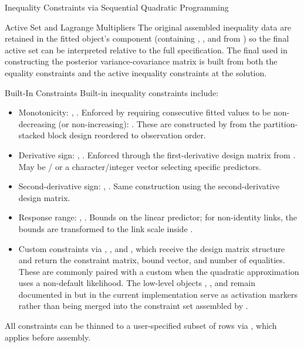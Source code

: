 \begin{Section}{Inequality Constraints via Sequential Quadratic Programming}
\begin{SubSection}{Active Set and Lagrange Multipliers}
The original assembled inequality data are retained in the fitted
object's  component (containing ,
, and  from ) so
the final active set can be interpreted relative to the full
specification. The final  used in constructing the
posterior variance-covariance matrix is built from both the equality
constraints and the active inequality constraints at the solution.
\end{SubSection}


%
\begin{SubSection}{Built-In Constraints}
Built-in inequality constraints include:
\begin{itemize}

\item{} Monotonicity: ,
. Enforced by requiring consecutive
fitted values to be non-decreasing (or non-increasing):
. These are constructed by  from
the partition-stacked block design reordered to observation order.
\item{} Derivative sign: ,
. Enforced through the
first-derivative design matrix from
. May be /
or a character/integer vector selecting specific predictors.
\item{} Second-derivative sign: ,
. Same construction using the
second-derivative design matrix.
\item{} Response range: , .
Bounds on the linear predictor; for non-identity links, the bounds
are transformed to the link scale inside .
\item{} Custom constraints via , ,
and , which receive the design matrix structure
and return the constraint matrix, bound vector, and number of
equalities. These are commonly paired with a custom
 when the quadratic approximation uses a
non-default likelihood. The low-level objects ,
, and  remain documented in
 but in the current implementation serve as
activation markers rather than being merged into the constraint set
assembled by .

\end{itemize}

All constraints can be thinned to a user-specified subset of rows via
, which  applies before
assembly.
\end{SubSection}

\end{Section}
